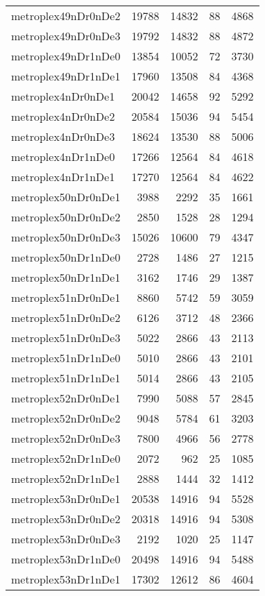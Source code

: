 \begin{tabular}{lrrrr}
metroplex49nDr0nDe2 & 19788 & 14832 & 88 & 4868 \\
metroplex49nDr0nDe3 & 19792 & 14832 & 88 & 4872 \\
metroplex49nDr1nDe0 & 13854 & 10052 & 72 & 3730 \\
metroplex49nDr1nDe1 & 17960 & 13508 & 84 & 4368 \\
metroplex4nDr0nDe1 & 20042 & 14658 & 92 & 5292 \\
metroplex4nDr0nDe2 & 20584 & 15036 & 94 & 5454 \\
metroplex4nDr0nDe3 & 18624 & 13530 & 88 & 5006 \\
metroplex4nDr1nDe0 & 17266 & 12564 & 84 & 4618 \\
metroplex4nDr1nDe1 & 17270 & 12564 & 84 & 4622 \\
metroplex50nDr0nDe1 & 3988 & 2292 & 35 & 1661 \\
metroplex50nDr0nDe2 & 2850 & 1528 & 28 & 1294 \\
metroplex50nDr0nDe3 & 15026 & 10600 & 79 & 4347 \\
metroplex50nDr1nDe0 & 2728 & 1486 & 27 & 1215 \\
metroplex50nDr1nDe1 & 3162 & 1746 & 29 & 1387 \\
metroplex51nDr0nDe1 & 8860 & 5742 & 59 & 3059 \\
metroplex51nDr0nDe2 & 6126 & 3712 & 48 & 2366 \\
metroplex51nDr0nDe3 & 5022 & 2866 & 43 & 2113 \\
metroplex51nDr1nDe0 & 5010 & 2866 & 43 & 2101 \\
metroplex51nDr1nDe1 & 5014 & 2866 & 43 & 2105 \\
metroplex52nDr0nDe1 & 7990 & 5088 & 57 & 2845 \\
metroplex52nDr0nDe2 & 9048 & 5784 & 61 & 3203 \\
metroplex52nDr0nDe3 & 7800 & 4966 & 56 & 2778 \\
metroplex52nDr1nDe0 & 2072 & 962 & 25 & 1085 \\
metroplex52nDr1nDe1 & 2888 & 1444 & 32 & 1412 \\
metroplex53nDr0nDe1 & 20538 & 14916 & 94 & 5528 \\
metroplex53nDr0nDe2 & 20318 & 14916 & 94 & 5308 \\
metroplex53nDr0nDe3 & 2192 & 1020 & 25 & 1147 \\
metroplex53nDr1nDe0 & 20498 & 14916 & 94 & 5488 \\
metroplex53nDr1nDe1 & 17302 & 12612 & 86 & 4604 \\

\end{tabular}
